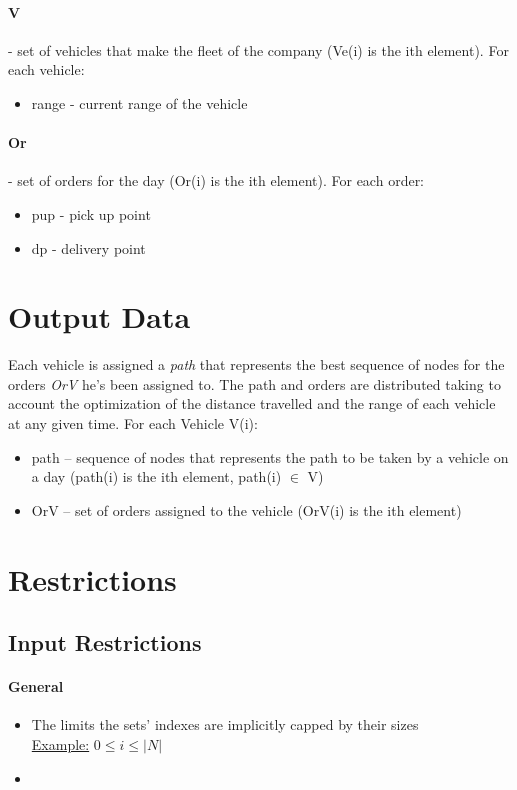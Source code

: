 \paragraph{V} - set of vehicles that make the fleet of the company (Ve(i) is the ith element). For each vehicle:
\begin{itemize}
	\item range - current range of the vehicle
\end{itemize}

\paragraph{Or} - set of orders for the day (Or(i) is the ith element). For each order:
\begin{itemize}
    \item pup - pick up point
	\item dp - delivery point
\end{itemize}


\section{Output Data}
Each vehicle is assigned a \textit{path} that represents the best sequence of nodes for the orders \textit{OrV} he's been assigned to. The path and orders are distributed taking to account the optimization of the distance travelled and the range of each vehicle at any given time.
For each Vehicle V(i):
\begin{itemize}
	\item path – sequence of nodes that represents the path to be taken by a vehicle on a day (path(i) is the ith element, path(i) $ \in $  V)
	\item OrV – set of orders assigned to the vehicle (OrV(i) is the ith element)
\end{itemize}


\section{Restrictions}


\subsection{Input Restrictions}
\paragraph{General}
\begin{itemize}
    \item The limits the sets' indexes are implicitly capped by their sizes\\ \uline{Example:}
    $ 0 \leq i \leq |N| $
    \item 
\end{itemize}

